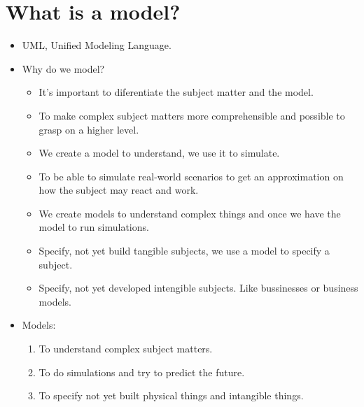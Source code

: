 \section{What is a model?}
\begin{itemize}
    \item UML, Unified Modeling Language.
    \item Why do we model? 
    \begin{itemize} 
            \item It's important to diferentiate the subject matter and the model.  
            \item To make complex subject matters more comprehensible and possible to grasp on a higher level.
            \item We create a model to understand, we use it to simulate.
            \item To be able to simulate real-world scenarios to get an approximation on how the subject may react and work.
            \item We create models to understand complex things and once we have the model to run simulations.
            \item Specify, not yet build tangible subjects, we use a model to specify a subject.
            \item Specify, not yet developed intengible subjects. Like bussinesses or business models.
        \end{itemize}
    
    \item Models:
        \begin{enumerate}
            \item To understand complex subject matters.
            \item To do simulations and try to predict the future.
            \item To specify not yet built physical things and intangible things.
        \end{enumerate}
\end{itemize}



